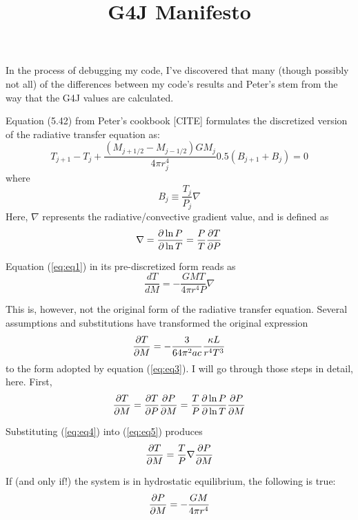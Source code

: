 \documentclass[fleqn]{article}
\title{G4J Manifesto}
\begin{document}
\maketitle
In the process of debugging my code, I've discovered that many (though
possibly not all) of the differences between my code's results and
Peter's stem from the way that the G4J values are calculated.

Equation (5.42) from Peter's cookbook [CITE] formulates the
discretized version of the radiative transfer equation as:
\begin{equation}
  T_{j+1} - T_{j} + \frac{(M_{j+1/2} - M_{j-1/2}) G M_j}{4\pi r_j^4}
  0.5(B_{j+1} + B_j) = 0
  \label{eq:eq1}
\end{equation}
where 
\begin{equation}
  B_j \equiv \frac{T_j}{P_j} \nabla
  \label{eq:eq2}
\end{equation}
Here, $\nabla$ represents the radiative/convective gradient value, and
is defined as
\begin{equation}
  \nabla = \frac{\partial \ln P}{\partial \ln T} = \frac{P}{T} \frac{\partial T}{\partial P}
  \label{eq:eq4}
\end{equation}

Equation (\ref{eq:eq1}) in its pre-discretized form reads as
\begin{equation}
  \frac{dT}{dM} = -\frac{GMT}{4\pi r^4 P}\nabla 
  \label{eq:eq3}
\end{equation}

This is, however, not the original form of the radiative transfer
equation.  Several assumptions and substitutions have transformed the
original expression
\begin{equation}
  \frac{\partial T}{\partial M} = -\frac{3}{64 \pi^2 ac} \frac{\kappa L}{r^4 T^3}
  \label{eq:eq4}
\end{equation}
to the form adopted by equation (\ref{eq:eq3}).  I will go through
those steps in detail, here.  
First,
\begin{equation}
  \frac{\partial T}{\partial M} = \frac{\partial T}{\partial P} \frac{\partial P}{\partial M} = \frac{T}{P} \frac{\partial \ln
    P}{\partial \ln T} \frac{\partial P}{\partial M} 
  \label{eq:eq5}
\end{equation}

Substituting (\ref{eq:eq4}) into (\ref{eq:eq5}) produces
\begin{equation}
  \frac{\partial T}{\partial M} = \frac{T}{P} \nabla \frac{\partial P}{\partial M}
  \label{eq:eq6}
\end{equation}

If (and only if!) the system is in hydrostatic equilibrium, the
following is true:
\begin{equation}
  \frac{\partial P}{\partial M} = -\frac{GM}{4\pi r^4}
  \label{eq:eq7}
\end{equation}
\end{document}
